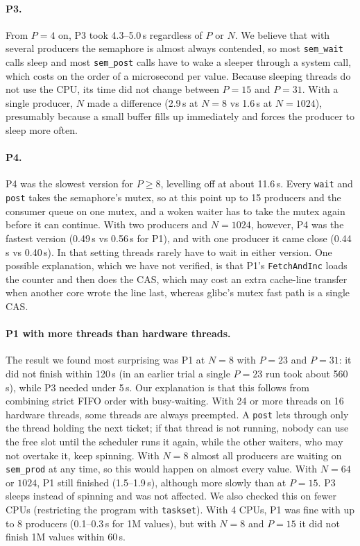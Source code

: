 \paragraph{P3.}
From $P = 4$ on, P3 took 4.3--5.0\,s regardless of $P$ or $N$. We believe that with several producers the semaphore is almost always contended,
so most \texttt{sem\_wait} calls sleep and most \texttt{sem\_post} calls have to wake a sleeper through a system call, which costs on the order of a microsecond per value.
Because sleeping threads do not use the CPU, its time did not change between $P = 15$ and $P = 31$. With a single producer, $N$ made a difference
(2.9\,s at $N=8$ vs 1.6\,s at $N=1024$), presumably because a small buffer fills up immediately and forces the producer to sleep more often.

\paragraph{P4.}
P4 was the slowest version for $P \ge 8$, levelling off at about 11.6\,s. Every \texttt{wait} and \texttt{post} takes the semaphore's mutex, so at this point
up to 15 producers and the consumer queue on one mutex, and a woken waiter has to take the mutex again before it can continue.
With two producers and $N = 1024$, however, P4 was the fastest version (0.49\,s vs 0.56\,s for P1), and with one producer it came close (0.44\,s vs 0.40\,s). In that setting threads rarely have to wait in either version.
One possible explanation, which we have not verified, is that P1's \texttt{FetchAndInc} loads the counter and then does the CAS, which may cost an extra cache-line transfer
when another core wrote the line last, whereas glibc's mutex fast path is a single CAS.

\paragraph{P1 with more threads than hardware threads.}
The result we found most surprising was P1 at $N = 8$ with $P = 23$ and $P = 31$: it did not finish within 120\,s (in an earlier trial a single
$P=23$ run took about 560\,s), while P3 needed under 5\,s. Our explanation is that this follows from combining strict FIFO order with busy-waiting.
With 24 or more threads on 16 hardware threads, some threads are always preempted. A \texttt{post} lets through only the thread holding the next ticket;
if that thread is not running, nobody can use the free slot until the scheduler runs it again, while the other waiters, who may not overtake it, keep spinning.
With $N = 8$ almost all producers are waiting on \texttt{sem\_prod} at any time, so this would happen on almost every value.
With $N = 64$ or $1024$, P1 still finished (1.5--1.9\,s), although more slowly than at $P = 15$. P3 sleeps instead of spinning and was not affected.
We also checked this on fewer CPUs (restricting the program with \texttt{taskset}). With 4 CPUs, P1 was fine with up to 8 producers (0.1--0.3\,s for 1M values),
but with $N = 8$ and $P = 15$ it did not finish 1M values within 60\,s.

